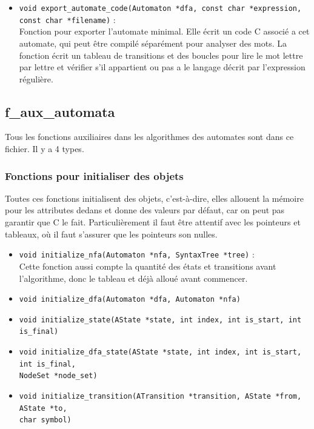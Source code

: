\documentclass[12pt]{article}
\begin{document}
\begin{itemize}
\begin{lstlisting}
    for (chaque etat du dfa minimal)
    | on marque les etats de depart ou finaux;

    on cree tableau des transitions;
    for (chaque transition du dfa minimal)
    | on ajoute au tableau;

    if (transition est nouvelle)
    | on ajoute au dfa minimal;

    for (chaque etat du dfa minimal)
    | if (etat deconecte)
    | | on marque comme supprime;
  \end{lstlisting}

  
  \item \lstinline|void export_automate_code(Automaton *dfa, const char *expression,|\\
  \lstinline|const char *filename)| : \\
  Fonction pour exporter l'automate minimal. Elle écrit un code C associé a cet automate, qui peut être compilé séparément pour analyser des mots. La fonction écrit un tableau de transitions et des boucles pour lire le mot lettre par lettre et vérifier s'il appartient ou pas a le langage décrit par l'expression régulière.
  
\end{itemize}

\subsection{f\_aux\_automata}
\label{sec:auxs_auto}
Tous les fonctions auxiliaires dans les algorithmes des automates sont dans ce fichier. Il y a 4 types.

\subsubsection{Fonctions pour initialiser des objets}
Toutes ces fonctions initialisent des objets, c'est-à-dire, elles allouent la mémoire pour les attributes dedans et donne des valeurs par défaut, car on peut pas garantir que C le fait. Particulièrement il faut être attentif avec les pointeurs et tableaux, où il faut s'assurer que les pointeurs son nulles.

\begin{itemize}
  \item \lstinline|void initialize_nfa(Automaton *nfa, SyntaxTree *tree)| : \\ 
  Cette fonction aussi compte la quantité des états et transitions avant l'algorithme, donc le tableau et déjà alloué avant commencer.
  \item \lstinline|void initialize_dfa(Automaton *dfa, Automaton *nfa)|
  \item \lstinline|void initialize_state(AState *state, int index, int is_start, int is_final)|
  \item \lstinline|void initialize_dfa_state(AState *state, int index, int is_start, int is_final,|\\
  \lstinline|NodeSet *node_set)|
  \item \lstinline|void initialize_transition(ATransition *transition, AState *from, AState *to,|\\
  \lstinline|char symbol)|
\end{itemize}
\end{document}
